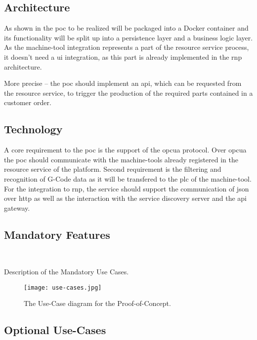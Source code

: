 \documentclass[
a4paper,
twoside,
headsepline,
cleardoublepage=empty,
parskip=half,
draft=false
]{scrbook}
\begin{document}
			\subsection{Architecture} \label{subsec:architecture}
			
				As shown in  the \gls{poc} to be realized will be packaged into a Docker container and its functionality will be split up into a persistence layer and a business logic layer.
				As the machine-tool integration represents a part of the resource service process, it doesn't need a \gls{ui} integration, as this part is already implemented in the \gls{rnp} architecture.
				
				More precise -- the \gls{poc} should implement an \gls{api}, which can be requested from the resource service, to trigger the production of the required parts contained in a customer order.
			
			\subsection{Technology} \label{subsec:technology}
			
				A core requirement to the \gls{poc} is the support of the \gls{opcua} protocol.
				Over \gls{opcua} the \gls{poc} should communicate with the machine-tools already registered in the resource service of the platform.
				Second requirement is the filtering and recognition of G-Code data as it will be transfered to the \gls{plc} of the machine-tool.
				For the integration to \gls{rnp}, the service should support the communication of \gls{json} over \gls{http} as well as the interaction with the service discovery server and the \gls{api} gateway.
			
			\subsection{Mandatory Features} \label{subsec:mandatory}
				
				Description of the Mandatory Use Cases.
				
				\begin{figure}[htbp]
					\centering
					\texttt{[image: use-cases.jpg]}
					\caption{The Use-Case diagram for the Proof-of-Concept.}
					\label{fig:use_cases}
				\end{figure}
				
			\subsection{Optional Use-Cases} \label{subsec:optional}	
				
\end{document}
